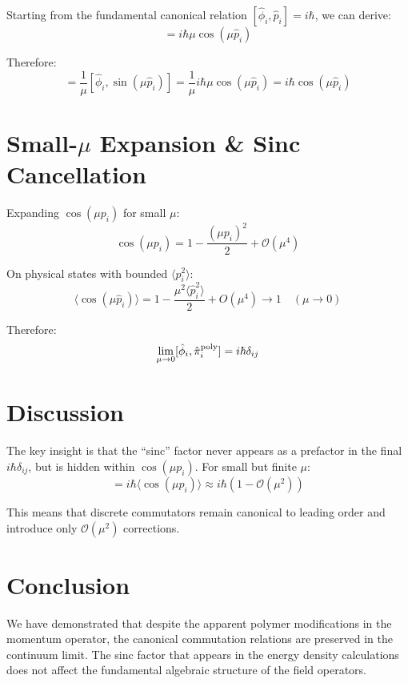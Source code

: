 \documentclass[11pt]{article}
\begin{document}
Starting from the fundamental canonical relation $[\hat{\phi}_i, \hat{p}_i] = i\hbar$, we can derive:
\begin{equation}
[\hat{\phi}_i, \sin(\mu\hat{p}_i)] = i\hbar\mu\cos(\mu\hat{p}_i)
\end{equation}

Therefore:
\begin{equation}
[\hat{\phi}_i, \hat{\pi}_i^{\rm poly}] = \frac{1}{\mu}[\hat{\phi}_i, \sin(\mu\hat{p}_i)] = \frac{1}{\mu}i\hbar\mu\cos(\mu\hat{p}_i) = i\hbar\cos(\mu\hat{p}_i)
\end{equation}

\section{Small-$\mu$ Expansion \& Sinc Cancellation}

Expanding $\cos(\mu p_i)$ for small $\mu$:
\begin{equation}
\cos(\mu p_i) = 1 - \frac{(\mu p_i)^2}{2} + \mathcal{O}(\mu^4)
\end{equation}

On physical states with bounded $\langle p_i^2 \rangle$:
\begin{equation}
\langle \cos(\mu\hat{p}_i) \rangle = 1 - \frac{\mu^2\langle \hat{p}_i^2 \rangle}{2} + O(\mu^4) \longrightarrow 1 \quad (\mu \to 0)
\end{equation}

Therefore:
\begin{equation}
\lim_{\mu \to 0} [\hat{\phi}_i, \hat{\pi}_i^{\rm poly}] = i\hbar\delta_{ij}
\end{equation}

\section{Discussion}

The key insight is that the ``sinc'' factor never appears as a prefactor in the final $i\hbar\delta_{ij}$, but is hidden within $\cos(\mu p_i)$. For small but finite $\mu$:
\begin{equation}
[\hat{\phi}_i, \hat{\pi}_i^{\rm poly}] = i\hbar\langle \cos(\mu p_i) \rangle \approx i\hbar(1 - \mathcal{O}(\mu^2))
\end{equation}

This means that discrete commutators remain canonical to leading order and introduce only $\mathcal{O}(\mu^2)$ corrections.

\section{Conclusion}

We have demonstrated that despite the apparent polymer modifications in the momentum operator, the canonical commutation relations are preserved in the continuum limit. The sinc factor that appears in the energy density calculations does not affect the fundamental algebraic structure of the field operators.
\end{document}
